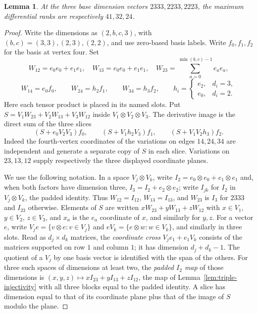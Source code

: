 \documentclass[11pt]{article}
\newtheorem{lemma}[theorem]{Lemma}
\theoremstyle{remark}\newtheorem{remark}[theorem]{Remark}
\begin{document}
\begin{lemma}\label{lem:four-analytic-bases}
At the three base dimension vectors $2333,2233,2223$, the maximum
differential ranks are respectively $41,32,24$.
\end{lemma}
\begin{proof}
Write the dimensions as $(2,b,c,3)$, with $(b,c)=(3,3),(2,3),(2,2)$,
and use zero-based basis labels. Write $f_0,f_1,f_2$ for the basis at
vertex four. Set
\[
 W_{12}=e_0e_0+e_1e_1,\quad W_{13}=e_0e_0+e_1e_1,\quad
 W_{23}=\sum_{a=0}^{\min(b,c)-1}e_ae_a,
\]
\[
 W_{14}=e_0f_0,\qquad W_{24}=h_2f_1,\qquad W_{34}=h_3f_2,
 \qquad h_i=\begin{cases}e_2,&d_i=3,\\e_0,&d_i=2.\end{cases}
\]
Here each tensor product is placed in its named slots. Put
$S=V_1W_{23}+V_2W_{13}+V_3W_{12}$ inside $V_1\otimes V_2\otimes V_3$.
The derivative image is the direct sum of the three slices
\[
 (S+e_0V_2V_3)f_0,\qquad
 (S+V_1h_2V_3)f_1,\qquad
 (S+V_1V_2h_3)f_2.
\]
Indeed the fourth-vertex coordinates of the variations on edges
$14,24,34$ are independent and generate a separate copy of $S$ in
each slice. Variations on $23,13,12$ supply respectively the three
displayed coordinate planes.

We use the following notation. In a space $V_j\otimes V_k$, write
$I_2=e_0\otimes e_0+e_1\otimes e_1$ and, when both factors have
dimension three, $I_3=I_2+e_2\otimes e_2$; write $I_{jk}$ for $I_2$ in
$V_j\otimes V_k$, the padded identity. Thus $W_{12}=I_{12}$,
$W_{13}=I_{13}$, and $W_{23}$ is $I_3$ for $2333$ and $I_{23}$
otherwise. Elements of $S$ are written $xW_{23}+yW_{13}+zW_{12}$ with
$x\in V_1$, $y\in V_2$, $z\in V_3$, and $x_a$ is the $e_a$ coordinate
of $x$, and similarly for $y,z$. For a vector $e$, write
$V_je=\{v\otimes e:v\in V_j\}$ and
$eV_k=\{e\otimes w:w\in V_k\}$, and similarly in three slots. Read as
$d_j\times d_k$ matrices, the \emph{coordinate cross} $V_je_1+e_1V_k$
consists of the matrices supported on row $1$ and column $1$; it has
dimension $d_j+d_k-1$. The quotient of a $V_j$ by one basis vector is
identified with the span of the others. For three such spaces of
dimensions at least two, the \emph{padded $I_2$ map} of those
dimensions is $(x,y,z)\mapsto xI_{23}+yI_{13}+zI_{12}$, the map of
Lemma~\ref{lem:triple-injectivity} with all three blocks equal to the
padded identity. A slice has dimension equal to that of its
coordinate plane plus that of the image of $S$ modulo the plane.


\end{proof}
\end{document}
